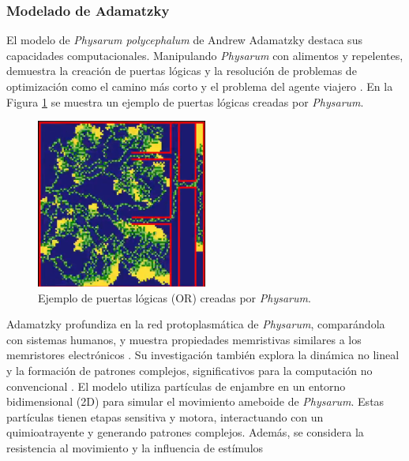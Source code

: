\clearpage
\subsubsection{Modelado de Adamatzky}

    El modelo de \textit{Physarum polycephalum} de Andrew Adamatzky destaca sus capacidades computacionales. 
        Manipulando \textit{Physarum} con alimentos y repelentes, demuestra la creaci\'on de puertas l\'ogicas y 
        la resoluci\'on de problemas de optimizaci\'on como el camino m\'as corto y el problema del agente viajero \cite{Adamatzky2010}.
        En la Figura \ref{fig:puertas_logicas} se muestra un ejemplo de puertas l\'ogicas creadas por \textit{Physarum}.
    \vskip 0.5cm
    \begin{figure}[h]
        \centering
        \includegraphics[width=0.5\textwidth]{./images/estado_del_arte/physarum/CompuertasLogicas.png}
        \caption{Ejemplo de puertas l\'ogicas (OR) creadas por \textit{Physarum}.}
        \label{fig:puertas_logicas}
    \end{figure}
    \vskip 0.5cm
    Adamatzky profundiza en la red protoplasm\'atica de \textit{Physarum}, compar\'andola con sistemas humanos, y 
        muestra propiedades memristivas similares a los memristores electr\'onicos \cite{Adamatzky2010}. Su investigaci\'on 
        tambi\'en explora la din\'amica no lineal y la formaci\'on de patrones complejos, significativos para la computaci\'on 
        no convencional \cite{Adamatzky2010}.
    \vskip 0.5cm
    El modelo utiliza part\'iculas de enjambre en un entorno bidimensional (2D) para simular el movimiento ameboide de 
        \textit{Physarum}. Estas part\'iculas tienen etapas sensitiva y motora, interactuando con un quimioatrayente 
        y generando patrones complejos. Adem\'as, se considera la resistencia al movimiento y la influencia de est\'imulos 
